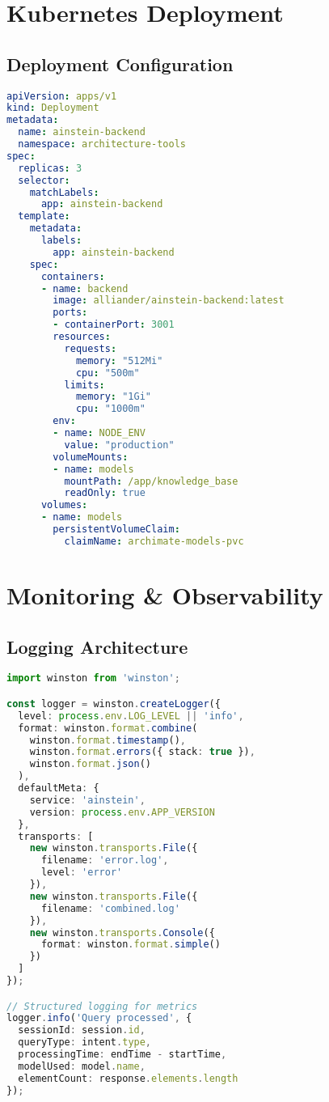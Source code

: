 \documentclass[12pt,a4paper]{report}
\begin{document}
\section{Kubernetes Deployment}

\subsection{Deployment Configuration}

\begin{lstlisting}[language=YAML, caption=kubernetes-deployment.yaml]
apiVersion: apps/v1
kind: Deployment
metadata:
  name: ainstein-backend
  namespace: architecture-tools
spec:
  replicas: 3
  selector:
    matchLabels:
      app: ainstein-backend
  template:
    metadata:
      labels:
        app: ainstein-backend
    spec:
      containers:
      - name: backend
        image: alliander/ainstein-backend:latest
        ports:
        - containerPort: 3001
        resources:
          requests:
            memory: "512Mi"
            cpu: "500m"
          limits:
            memory: "1Gi"
            cpu: "1000m"
        env:
        - name: NODE_ENV
          value: "production"
        volumeMounts:
        - name: models
          mountPath: /app/knowledge_base
          readOnly: true
      volumes:
      - name: models
        persistentVolumeClaim:
          claimName: archimate-models-pvc
\end{lstlisting}

\section{Monitoring \& Observability}

\subsection{Logging Architecture}

\begin{lstlisting}[language=TypeScript, caption=Structured Logging]
import winston from 'winston';

const logger = winston.createLogger({
  level: process.env.LOG_LEVEL || 'info',
  format: winston.format.combine(
    winston.format.timestamp(),
    winston.format.errors({ stack: true }),
    winston.format.json()
  ),
  defaultMeta: {
    service: 'ainstein',
    version: process.env.APP_VERSION
  },
  transports: [
    new winston.transports.File({
      filename: 'error.log',
      level: 'error'
    }),
    new winston.transports.File({
      filename: 'combined.log'
    }),
    new winston.transports.Console({
      format: winston.format.simple()
    })
  ]
});

// Structured logging for metrics
logger.info('Query processed', {
  sessionId: session.id,
  queryType: intent.type,
  processingTime: endTime - startTime,
  modelUsed: model.name,
  elementCount: response.elements.length
});
\end{lstlisting}
\end{document}
